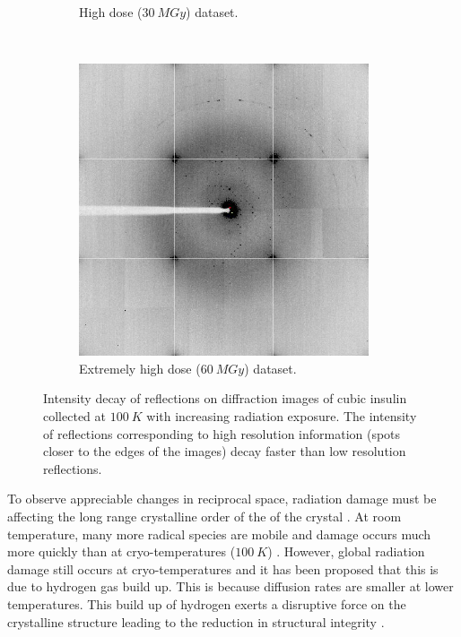 \begin{figure}
\begin{subfigure}[b]{0.45\textwidth}
                    \caption{High dose ($30\ MGy$) dataset.}
                    \label{fig:Intensity decay insulin diffraction image 30MGy}
            \end{subfigure}
            \\
            \begin{subfigure}[b]{0.45\textwidth}
                    \centering
                    \includegraphics[width=\textwidth]{figures/introduction/intensityloss_60MGy.png}
                    \caption{Extremely high dose ($60\ MGy$) dataset.}
                    \label{fig:Intensity decay insulin diffraction image 60MGy}
            \end{subfigure}
            \caption{Intensity decay of reflections on diffraction images of cubic insulin collected at $100\ K$ with increasing radiation exposure. The intensity of reflections corresponding to high resolution information (spots closer to the edges of the images) decay faster than low resolution reflections.}
            \label{fig:Intensity decay insulin diffraction images}
        \end{figure}

        To observe appreciable changes in reciprocal space, radiation damage must be affecting the long range crystalline order of the of the crystal \cite{meents2010}.
        At room temperature, many more radical species are mobile and damage occurs much more quickly than at cryo-temperatures ($100\ K$) \cite{henderson1990cryo,weik2010temperature}.
        However, global radiation damage still occurs at cryo-temperatures and it has been proposed that this is due to hydrogen gas build up.
		This is because diffusion rates are smaller at lower temperatures.
		This build up of hydrogen exerts a disruptive force on the crystalline structure leading to the reduction in structural integrity \cite{meents2010}.

